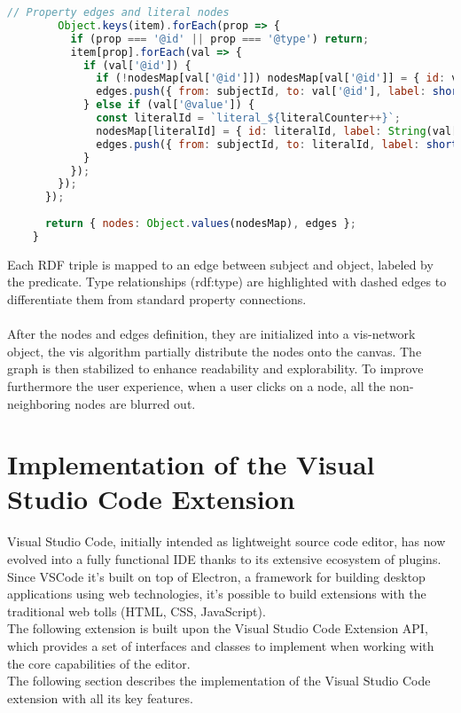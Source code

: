 \begin{lstlisting}[caption={\texttt{processJsonLd} function used for graph construction}, label={lst:rdf-visualizer}, language=JavaScript]
		// Property edges and literal nodes
		Object.keys(item).forEach(prop => {
		  if (prop === '@id' || prop === '@type') return;
		  item[prop].forEach(val => {
			if (val['@id']) {
			  if (!nodesMap[val['@id']]) nodesMap[val['@id']] = { id: val['@id'], label: shorten(val['@id'], dynamicPrefixes), shape: 'dot', ... };
			  edges.push({ from: subjectId, to: val['@id'], label: shorten(prop, dynamicPrefixes), arrows: 'to', ... });
			} else if (val['@value']) {
			  const literalId = `literal_${literalCounter++}`;
			  nodesMap[literalId] = { id: literalId, label: String(val['@value']), shape: 'box', color: '#FFD700', ... };
			  edges.push({ from: subjectId, to: literalId, label: shorten(prop, dynamicPrefixes), arrows: 'to', ... });
			}
		  });
		});
	  });
	
	  return { nodes: Object.values(nodesMap), edges };
	}
	\end{lstlisting}
	
Each RDF triple is mapped to an edge between subject and object, labeled by the predicate. Type relationships (rdf:type) are highlighted with dashed edges to differentiate them from standard property connections.
\\
\\
After the nodes and edges definition, they are initialized into a vis-network object, the vis algorithm partially distribute the nodes onto the canvas. The graph is then stabilized to enhance readability and explorability. To improve furthermore the user experience, when a user clicks on a node, all the non-neighboring nodes are blurred out. 


\section{Implementation of the Visual Studio Code Extension}	


Visual Studio Code, initially intended as lightweight source code editor, has now evolved into a fully functional IDE thanks to its extensive ecosystem of plugins.
\\
Since VSCode it's built on top of Electron, a framework for building desktop applications using web technologies, it's possible to build extensions with the traditional web tolls (HTML, CSS, JavaScript).
\\
The following extension is built upon the Visual Studio Code Extension API, which provides a set of interfaces and classes to implement when working with the core capabilities of the editor.
\\
The following section describes the implementation of the Visual Studio Code extension with all its key features. 

